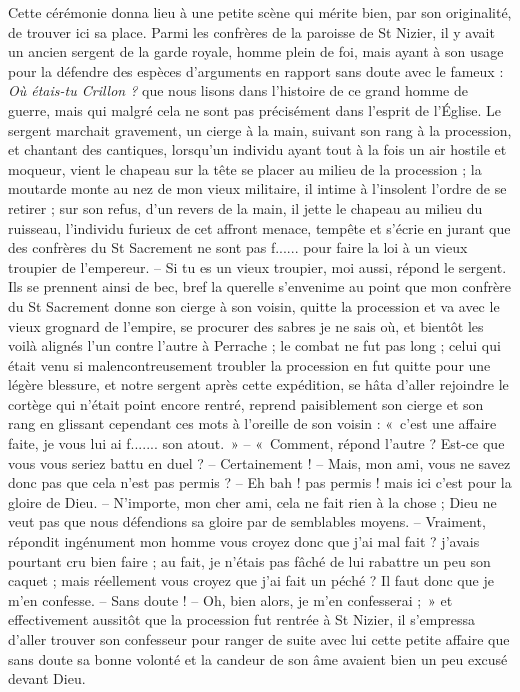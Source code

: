 \documentclass[11pt,a4paper]{report}
\begin{document}
Cette cérémonie donna lieu à une petite scène qui mérite bien, par son originalité, de trouver ici sa place. Parmi les confrères de la paroisse de St Nizier, il y avait un ancien sergent de la garde royale, homme plein de foi, mais ayant à son usage pour la défendre des espèces d'arguments en rapport sans doute avec le fameux : \textit{Où étais-tu Crillon ?} que nous lisons dans l'histoire de ce grand homme de guerre, mais qui malgré cela ne sont pas précisément dans l'esprit de l'Église. Le sergent marchait gravement, un cierge à la main, suivant son rang à la procession, et chantant des cantiques, lorsqu'un individu ayant tout à la fois un air hostile et moqueur, vient le chapeau sur la tête se placer au milieu de la procession ; la moutarde monte au nez de mon vieux militaire, il intime à l'insolent l'ordre de se retirer ; sur son refus, d'un revers de la main, il jette le chapeau au milieu du ruisseau, l'individu furieux de cet affront menace, tempête et s'écrie en jurant que des confrères du St Sacrement ne sont pas f...... pour faire la loi à un vieux troupier de l'empereur. -- Si tu es un vieux troupier, moi aussi, répond le sergent. Ils se prennent ainsi de bec, bref la querelle s'envenime au point que mon confrère du St Sacrement donne son cierge à son voisin, quitte la procession et va avec le vieux grognard de l'empire, se procurer des sabres je ne sais où, et bientôt les voilà alignés l'un contre l'autre à Perrache ; le combat ne fut pas long ; celui qui était venu si malencontreusement troubler la procession en fut quitte pour une légère blessure, et notre sergent après cette expédition, se hâta d'aller rejoindre le cortège qui n'était point encore rentré, reprend paisiblement son cierge et son rang en glissant cependant ces mots à l'oreille de son voisin : «~c'est une affaire faite, je vous lui ai f....... son atout.~» -- «~Comment, répond l'autre ? Est-ce que vous vous seriez battu en duel ? -- Certainement ! -- Mais, mon ami, vous ne savez donc pas que cela n'est pas permis ? -- Eh bah ! pas permis ! mais ici c'est pour la gloire de Dieu. -- N'importe, mon cher ami, cela ne fait rien à la chose ; Dieu ne veut pas que nous défendions sa gloire par de semblables moyens. -- Vraiment, répondit ingénument mon homme vous croyez donc que j'ai mal fait ? j'avais pourtant cru bien faire ; au fait, je n'étais pas fâché de lui rabattre un peu son caquet ; mais réellement vous croyez que j'ai fait un péché ? Il faut donc que je m'en confesse. -- Sans doute ! -- Oh, bien alors, je m'en confesserai ;~» et effectivement aussitôt que la procession fut rentrée à St Nizier, il s'empressa d'aller trouver son confesseur pour ranger de suite avec lui cette petite affaire que sans doute sa bonne volonté et la candeur de son âme avaient bien un peu excusé devant Dieu.
\end{document}
